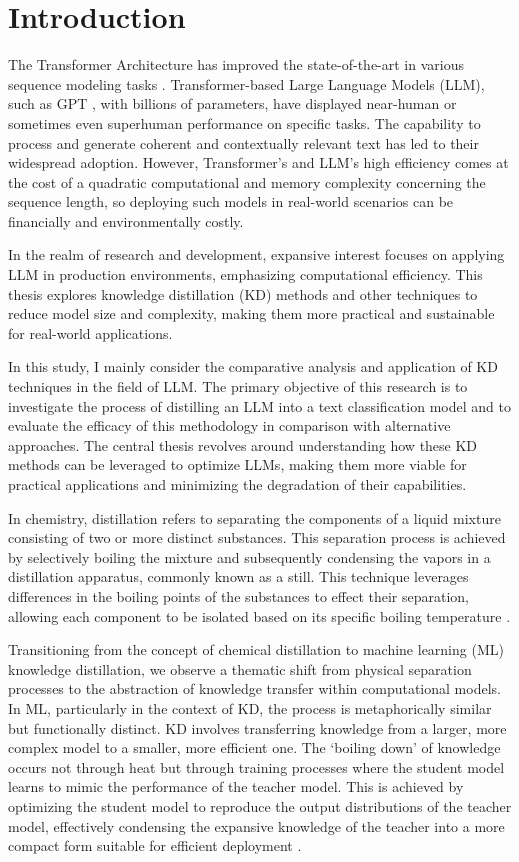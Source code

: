 \chapter{Introduction}
\label{chap:intro}

The Transformer Architecture has improved the state-of-the-art in various sequence modeling tasks \cite{attention}. Transformer-based Large Language Models (LLM), such as GPT \cite{gpt}, with billions of parameters, have displayed near-human or sometimes even superhuman performance on specific tasks. The capability to process and generate coherent and contextually relevant text has led to their widespread adoption. However, Transformer's and LLM's high efficiency comes at the cost of a quadratic computational and memory complexity concerning the sequence length, so deploying such models in real-world scenarios can be financially and environmentally costly.

In the realm of research and development, expansive interest focuses on applying LLM in production environments, emphasizing computational efficiency. This thesis explores knowledge distillation (KD) methods and other techniques to reduce model size and complexity, making them more practical and sustainable for real-world applications.

In this study, I mainly consider the comparative analysis and application of KD techniques in the field of LLM\@. The primary objective of this research is to investigate the process of distilling an LLM into a text classification model and to evaluate the efficacy of this methodology in comparison with alternative approaches. The central thesis revolves around understanding how these KD methods can be leveraged to optimize LLMs, making them more viable for practical applications and minimizing the degradation of their capabilities.

In chemistry, distillation refers to separating the components of a liquid mixture consisting of two or more distinct substances. This separation process is achieved by selectively boiling the mixture and subsequently condensing the vapors in a distillation apparatus, commonly known as a still. This technique leverages differences in the boiling points of the substances to effect their separation, allowing each component to be isolated based on its specific boiling temperature \cite{chem_distil}.

Transitioning from the concept of chemical distillation to machine learning (ML) knowledge distillation, we observe a thematic shift from physical separation processes to the abstraction of knowledge transfer within computational models. In ML, particularly in the context of KD, the process is metaphorically similar but functionally distinct. KD involves transferring knowledge from a larger, more complex model to a smaller, more efficient one. The `boiling down' of knowledge occurs not through heat but through training processes where the student model learns to mimic the performance of the teacher model. This is achieved by optimizing the student model to reproduce the output distributions of the teacher model, effectively condensing the expansive knowledge of the teacher into a more compact form suitable for efficient deployment \cite{distilling}.


